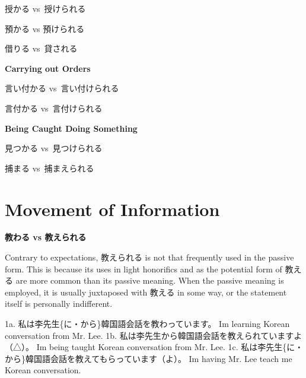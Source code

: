 \begin{center}
授かる vs 授けられる 
\end{center}

\begin{center}
預かる vs 預けられる 
\end{center}

\begin{center}
借りる vs 貸される 
\end{center}

\begin{center}
\textbf{Carrying out Orders }
\end{center}

\begin{center}
言い付かる vs 言い付けられる 
\end{center}

\begin{center}
言付かる vs 言付けられる 
\end{center}

\begin{center}
\textbf{Being Caught Doing Something }
\end{center}

\begin{center}
見つかる vs 見つけられる 
\end{center}

\begin{center}
捕まる vs 捕まえられる 
\end{center}
      
\section{Movement of Information}
 
\begin{center}
\textbf{教わる vs 教えられる }
\end{center}

\par{ Contrary to expectations, 教えられる is not that frequently used in the passive form. This is because its uses in light honorifics and as the potential form of 教える are more common than its passive meaning. When the passive meaning is employed, it is usually juxtaposed with 教える in some way, or the statement itself is personally indifferent. }

\par{1a. 私は李先生\{に・から\}韓国語会話を教わっています。 \hfill\break
I\textquotesingle m learning Korean conversation from Mr. Lee. \hfill\break
1b. 私は李先生から韓国語会話を教えられていますよ（△）。 \hfill\break
I\textquotesingle m being taught Korean conversation from Mr. Lee. \hfill\break
1c. 私は李先生\{に・から\}韓国語会話を教えてもらっています（よ）。 \hfill\break
I\textquotesingle m having Mr. Lee teach me Korean conversation. }

